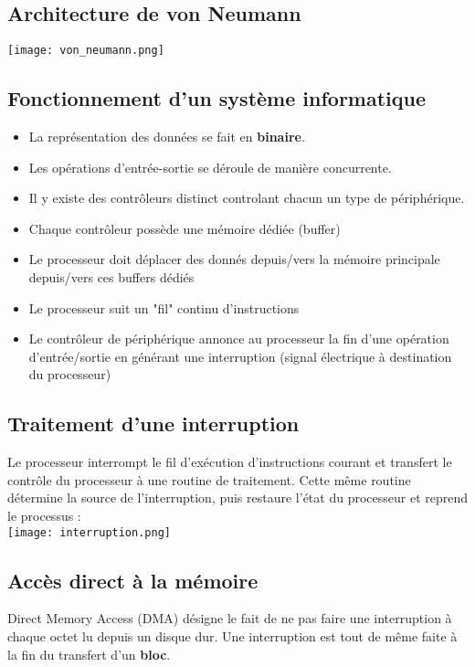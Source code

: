 \documentclass{article}
\begin{document}
    \subsection{Architecture de von Neumann}
        \texttt{[image: von\_neumann.png]}
    
    \subsection{Fonctionnement d'un système informatique}
        \begin{itemize}
            \item La représentation des données se fait en \textbf{binaire}.
            \item Les opérations d'entrée-sortie se déroule de manière concurrente.
            \item Il y existe des contrôleurs distinct controlant chacun un type de périphérique.
            \item Chaque contrôleur possède une mémoire dédiée (buffer)
            \item Le processeur doit déplacer des donnés depuis/vers la
            mémoire principale depuis/vers ces buffers dédiés
            \item Le processeur suit un "fil" continu d’instructions
            \item Le contrôleur de périphérique annonce au
            processeur la fin d’une opération d’entrée/sortie en
            générant une interruption (signal électrique à destination du processeur)
        \end{itemize}

    \subsection{Traitement d'une interruption}
        Le processeur interrompt le fil d’exécution d’instructions courant et
        transfert le contrôle du processeur à une routine de traitement.
        Cette même routine détermine la source de l'interruption, puis restaure l'état du processeur
        et reprend le processus :\\
        \texttt{[image: interruption.png]}

    \subsection{Accès direct à la mémoire}
        Direct Memory Access (DMA) désigne le fait de ne pas faire une interruption à chaque octet lu depuis un disque dur.
        Une interruption est tout de même faite à la fin du transfert d'un \textbf{bloc}.
    
\end{document}
